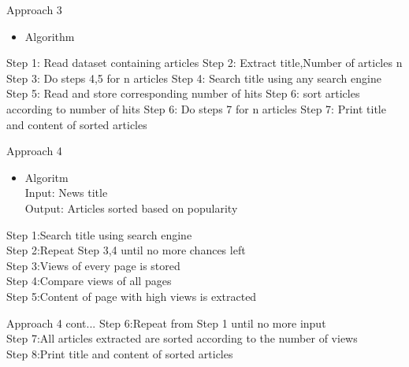 \documentclass{beamer}
\begin{document}
	
	
	       
	
	\begin{frame}{Approach 3}
		\begin{itemize}
			\item \Large Algorithm
		\end{itemize}
		\Large{Step 1: Read dataset containing articles \newline
		Step 2: Extract title,Number of articles n \newline
		Step 3: Do steps 4,5 for n articles \newline
		Step 4: Search title using any search engine \newline
		Step 5: Read and store corresponding number of hits \newline
		Step 6: sort articles according to number of hits \newline
		Step 6: Do steps 7 for n articles \newline
		Step 7: Print title and content of sorted articles}
		
	\end{frame}
	\begin{frame}{Approach 4}
		   \begin{itemize}
        	\item \Large Algoritm\\
        	\footnotesize
        	\Large{Input: News title\\
        	Output: Articles sorted based on popularity \\  }
   	   \end{itemize}	
           \Large{ Step 1:Search title using search engine\\
            Step 2:Repeat Step 3,4 until no more chances left\\
            Step 3:Views of every page is stored\\
            Step 4:Compare views of all pages\\
            Step 5:Content of page with high views is extracted\\
            }


	\end{frame}
	\begin{frame}{Approach 4 cont...}
	    \Large{Step 6:Repeat from Step 1 until no more input\\
            Step 7:All articles extracted are sorted according to the number of views\\
            Step 8:Print title and content of sorted articles\\} 
	\end{frame}
\end{document}

